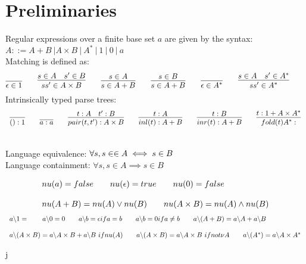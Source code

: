 \documentclass[a4paper,UKenglish,cleveref, autoref, thm-restate]{lipics-v2021}
\begin{document}
\section{Preliminaries}
\begin{definition}
Regular expressions over a finite base set $a$ are given by the syntax:\\
$A ::= A + B~| A \times B ~|~A ^* ~|~ 1 ~|~ 0 ~|~ a$\\
Matching is defined as:\\
\begin{displaymath} 
\infer{\match{\epsilon}{1}}{}\qquad
\infer{\match{s s'}{A \times B}}{\match{s}{A} & \match{s'}{B}} \qquad
\infer{\match{s} {A + B}}{\match{s}{A}} \qquad
\infer{\match{s} {A + B}}{\match{s}{B}} \qquad
\infer{\match{\epsilon}{A^*}}{}\qquad
\infer{\match{s s'}{A^*}}{\match{s}{A} & \match{s'}{A^*}}\qquad
\end{displaymath}
Intrinsically typed parse trees:
\begin{displaymath}
\begin{array}{l}
\infer{\oft{()}{1}}{} \qquad 
\infer{\oft{a}{a}}{} \qquad \infer{\oft{\pair{t}{t'}}{A \times B}}{\oft{t}{A} & \oft{t'}{B}}
\qquad \infer{\oft{\inl {t}}{A + B}}{\oft{t}{A}} \qquad
\infer{\oft{\inr {t}}{A + B}}{\oft{t}{B}}  \qquad
\infer{\oft{\fold{t}{A^*}}}{\oft{t}{1 + A \times A^*}}
\end{array}
\end{displaymath}
\end{definition}
\begin{definition}[Equivalence] \noindent \\
Language equivalence: $\forall s, s \in \in A \iff s \in B$\\
Language containment: $\forall s, s \in A \implies s \in B$
\end{definition}
\begin{definition}
\begin{displaymath}
\begin{array}{l}
\mynu{a} = \false \qquad
\mynu{\epsilon} = \true \qquad
\mynu{0} = \false
\\\\
\mynu{A + B} = \mynu A  \lor \mynu B \qquad
\mynu{A \times B} = \mynu A  \land \mynu B
\end{array}
\end{displaymath}
\begin{displaymath}
\begin{array}{l}
\derive {a}{1} = \qquad
\derive{a}{0} = 0 \qquad
\derive{a}{b} = \epsilon if a = b\qquad
\derive{a}{b} = 0 if a \neq b\qquad
\derive {a}{(A + B)} = \derive{a}{A} +  \derive{a}{B}\qquad
\\\\
\derive {a}{(A \times B)} = \derive{a}{A} \times B +  \derive{a}{B} ~if \mynu{A} \qquad
\derive {a}{(A \times B)} = \derive{a}{A} \times B ~if not \nu{A} \qquad
\derive {a}{(A^*)} = \derive{a}{A} \times A^*
\end{array}
\end{displaymath}
\end{definition}j
\end{document}
